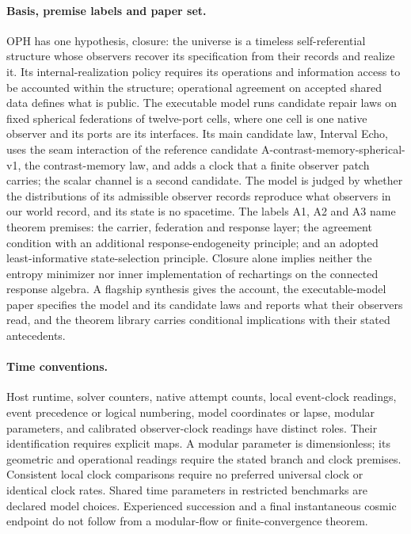 \paragraph{Basis, premise labels and paper set.}
OPH has one hypothesis, closure: the universe is a timeless self-referential
structure whose observers recover its specification from their records and
realize it. Its internal-realization policy requires its operations and
information access to be accounted within the structure; operational
agreement on accepted shared data defines what is public. The
executable model runs candidate repair laws on fixed spherical federations
of twelve-port cells, where one cell is one native observer and its ports
are its interfaces. Its main candidate law, Interval Echo, uses the seam
interaction of the reference candidate A-contrast-memory-spherical-v1, the
contrast-memory law, and adds a clock that a finite observer patch carries;
the scalar channel is a second candidate. The model is judged by whether the
distributions of its admissible observer records reproduce what observers in
our world record, and its state is no spacetime. The labels A1, A2 and A3 name theorem
premises: the carrier, federation and response layer; the agreement condition
with an additional response-endogeneity principle; and an adopted
least-informative state-selection principle. Closure alone implies neither
the entropy minimizer nor inner implementation of rechartings on the
connected response algebra.
A flagship synthesis gives the account, the executable-model paper specifies
the model and its candidate laws and reports what their observers read, and the theorem library
carries conditional implications with their stated antecedents.
\fi

\paragraph{Time conventions.}
Host runtime, solver counters, native attempt counts, local event-clock
readings, event precedence or logical numbering, model coordinates or lapse,
modular parameters, and calibrated observer-clock readings have distinct
roles. Their identification requires explicit maps.
A modular parameter is dimensionless; its geometric and operational readings
require the stated branch and clock premises. Consistent local clock
comparisons require no preferred universal clock or identical clock rates.
Shared time parameters in restricted benchmarks are declared model choices.
Experienced succession and a final instantaneous cosmic endpoint do not follow
from a modular-flow or finite-convergence theorem.
